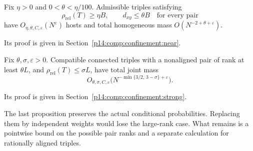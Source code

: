 \begin{proposition}
\label{p13:conf:near-primitive}
Fix \(\eta>0\) and \(0<\theta<\eta/100\).
Admissible triples satisfying
\[
 \rho_{\mathrm{rel}}(T)\ge\eta B,\qquad
 d_{xy}\le\theta B\quad\text{for every pair}
\]
have \(O_{\eta,\theta,C,\varepsilon}(N^\varepsilon)\)
hosts and total homogeneous mass
\(O(N^{-2+\theta+\varepsilon})\).
\end{proposition}

Its proof is given in Section~\ref{p14:comp:confinement:near}.

\begin{proposition}
\label{p13:conf:strong-profile}
Fix \(\theta,\sigma,\varepsilon>0\).
Compatible connected triples with a nonaligned pair
of rank at least \(\theta L\), and
\(\rho_{\mathrm{rel}}(T)\le\sigma L\), have total
joint mass
\[
 O_{\theta,\sigma,C,\varepsilon}
       \bigl(N^{-\min\{3/2,\,3-\sigma\}+\varepsilon}\bigr).
\]
\end{proposition}

Its proof is given in Section~\ref{p14:comp:confinement:strong}.



The last proposition preserves the actual conditional
probabilities. Replacing them by independent weights
would lose the large-rank case. What remains is a
pointwise bound on the possible pair ranks and a separate
calculation for rationally aligned triples.
